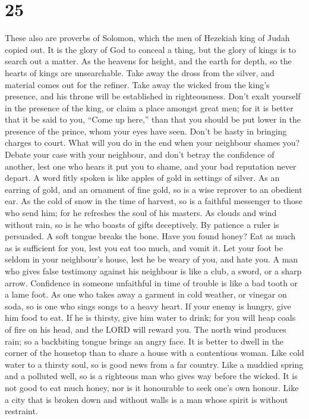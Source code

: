 \hypertarget{section-20}{%
\section{25}\label{section-20}}

 These also are proverbs of Solomon, which the men of
Hezekiah king of Judah copied out.  It is the glory of God
to conceal a thing, but the glory of kings is to search out a matter.
 As the heavens for height, and the earth for depth, so the
hearts of kings are unsearchable.  Take away the dross from
the silver, and material comes out for the refiner.  Take
away the wicked from the king's presence, and his throne will be
established in righteousness.  Don't exalt yourself in the
presence of the king, or claim a place amongst great men; 
for it is better that it be said to you, ``Come up here,'' than that you
should be put lower in the presence of the prince, whom your eyes have
seen.  Don't be hasty in bringing charges to court. What
will you do in the end when your neighbour shames you? 
Debate your case with your neighbour, and don't betray the confidence of
another,  lest one who hears it put you to shame, and your
bad reputation never depart.  A word fitly spoken is like
apples of gold in settings of silver.  As an earring of
gold, and an ornament of fine gold, so is a wise reprover to an obedient
ear.  As the cold of snow in the time of harvest, so is a
faithful messenger to those who send him; for he refreshes the soul of
his masters.  As clouds and wind without rain, so is he who
boasts of gifts deceptively.  By patience a ruler is
persuaded. A soft tongue breaks the bone.  Have you found
honey? Eat as much as is sufficient for you, lest you eat too much, and
vomit it.  Let your foot be seldom in your neighbour's
house, lest he be weary of you, and hate you.  A man who
gives false testimony against his neighbour is like a club, a sword, or
a sharp arrow.  Confidence in someone unfaithful in time of
trouble is like a bad tooth or a lame foot.  As one who
takes away a garment in cold weather, or vinegar on soda, so is one who
sings songs to a heavy heart.  If your enemy is hungry,
give him food to eat. If he is thirsty, give him water to drink;
 for you will heap coals of fire on his head, and the LORD
will reward you.  The north wind produces rain; so a
backbiting tongue brings an angry face.  It is better to
dwell in the corner of the housetop than to share a house with a
contentious woman.  Like cold water to a thirsty soul, so
is good news from a far country.  Like a muddied spring and
a polluted well, so is a righteous man who gives way before the wicked.
 It is not good to eat much honey, nor is it honourable to
seek one's own honour.  Like a city that is broken down and
without walls is a man whose spirit is without restraint.

